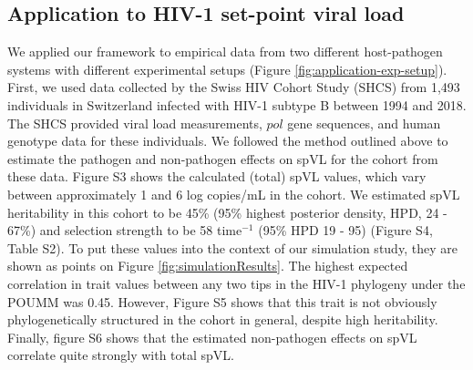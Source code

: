 \documentclass[11pt]{article}
\begin{document}
\begin{linenumbers}
\subsection*{Application to HIV-1 set-point viral load}

We applied our framework to empirical data from two different host-pathogen systems with different experimental setups (Figure \ref{fig:application-exp-setup}). First, we used data collected by the Swiss HIV Cohort Study (SHCS) from 1,493 individuals in Switzerland infected with HIV-1 subtype B between 1994 and 2018. The SHCS provided viral load measurements, $pol$ gene sequences, and human genotype data for these individuals. We followed the method outlined above to estimate the pathogen and non-pathogen effects on spVL for the cohort from these data. Figure S3 shows the calculated (total) spVL values, which vary between approximately 1 and 6 log copies/mL in the cohort.  We estimated spVL heritability in this cohort to be 45\% (95\% highest posterior density, HPD, 24 - 67\%) and selection strength to be 58 time$^{-1}$ (95\% HPD 19 - 95) (Figure S4, Table S2). To put these values into the context of our simulation study, they are shown as points on Figure \ref{fig:simulationResults}. The highest expected correlation in trait values between any two tips in the HIV-1 phylogeny under the POUMM was 0.45. However, Figure S5 shows that this trait is not obviously phylogenetically structured in the cohort in general, despite high heritability. Finally, figure S6 shows that the estimated non-pathogen effects on spVL correlate quite strongly with total spVL. 


\end{linenumbers}
\end{document}
